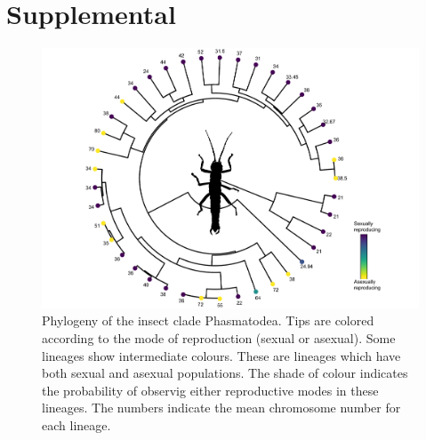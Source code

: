 \section{Supplemental}
\vfill

\setcounter{figure}{0}
\renewcommand{\thefigure}{S\arabic{figure}}
\setcounter{table}{0}
\renewcommand{\thetable}{S\arabic{table}}

\newpage
\begin{figure}
\centering \includegraphics[width=1\textwidth]{figures/phasmatodea_phylogeny.pdf}
\caption{Phylogeny of the insect clade Phasmatodea. Tips are colored according to the mode of reproduction (sexual or asexual). Some lineages show intermediate colours. These are lineages which have both sexual and asexual populations. The shade of colour indicates the probability of observig either reproductive modes in these lineages. The numbers indicate the mean chromosome number for each lineage.}
\label{fig:phas.phylo}
\end{figure}

